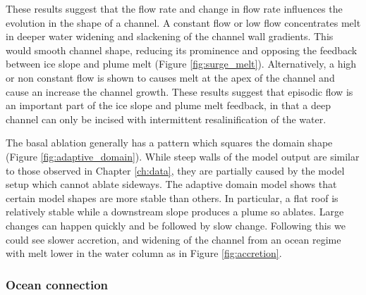 These results suggest that the flow rate and change in flow rate influences the evolution in the shape of a channel. A constant flow or low flow concentrates melt in deeper water widening and slackening of the channel wall gradients. This would smooth channel shape, reducing its prominence and opposing the feedback between ice slope and plume melt (Figure \ref{fig:surge_melt}). 
Alternatively, a high or non constant flow is shown to causes melt at the apex of the channel and cause an increase the channel growth. 
These results suggest that episodic flow is an important part of the ice slope and plume melt feedback, in that a deep channel can only be incised with intermittent resalinification of the water. 

The basal ablation generally has a pattern which squares the domain shape (Figure \ref{fig:adaptive_domain}). While steep walls of the model output are similar to those observed in Chapter \ref{ch:data}, they are partially caused by the model setup which cannot ablate sideways. The adaptive domain model shows that certain model shapes are more stable than others. In particular, a flat roof is relatively stable while a downstream slope produces a plume so ablates. Large changes can happen quickly and be followed by slow change.  Following this we could see slower accretion, and widening of the channel from an ocean regime with melt lower in the water column as in Figure \ref{fig:accretion}.



\subsubsection{Ocean connection}

